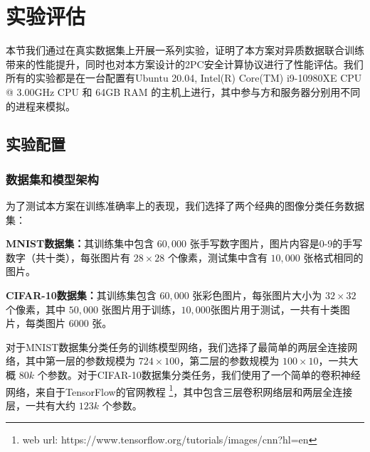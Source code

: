 \section{实验评估}\label{4-exp}
本节我们通过在真实数据集上开展一系列实验，证明了本方案对异质数据联合训练带来的性能提升，同时也对本方案设计的2PC安全计算协议进行了性能评估。我们所有的实验都是在一台配置有Ubuntu 20.04, Intel(R) Core(TM) i9-10980XE CPU @ 3.00GHz CPU 和 64GB RAM 的主机上进行，其中参与方和服务器分别用不同的进程来模拟。

\subsection{实验配置}

\subsubsection{数据集和模型架构}
为了测试本方案在训练准确率上的表现，我们选择了两个经典的图像分类任务数据集：
\begin{compactitem}
	\item \textbf{MNIST数据集：}其训练集中包含 $60,000$ 张手写数字图片，图片内容是0-9的手写数字（共十类），每张图片有 $28 \times28$ 个像素，测试集中含有 $10,000$ 张格式相同的图片。
	\item \textbf{CIFAR-10数据集：}其训练集包含 $60,000$ 张彩色图片，每张图片大小为 $32 \times 32$ 个像素，其中 $50,000$ 张图片用于训练，$10,000$张图片用于测试，一共有十类图片，每类图片 $6000$ 张。
\end{compactitem}
对于MNIST数据集分类任务的训练模型网络，我们选择了最简单的两层全连接网络，其中第一层的参数规模为 $724 \times 100$，第二层的参数规模为 $100 \times 10$，一共大概 $80k$ 个参数。对于CIFAR-10数据集分类任务，我们使用了一个简单的卷积神经网络，来自于TensorFlow的官网教程 \footnote{web url: https://www.tensorflow.org/tutorials/images/cnn?hl=en}，其中包含三层卷积网络层和两层全连接层，一共有大约 $123k$ 个参数。


